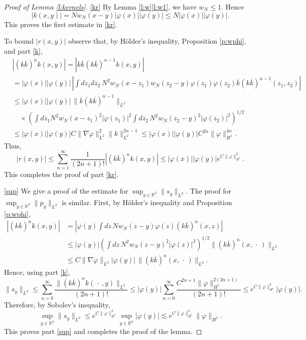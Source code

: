 \documentclass[11pt,a4paper,DIV11]{scrartcl}	%
\newcommand{\R}{\mathds{R}}
\begin{document}
\begin{proof}[Proof of Lemma \ref{l:kernels}]
  \ref{kr} By Lemma \ref{l:w}\ref{l:w1}, we have $w_N \leq 1$. Hence
  \[
    |k(x,y)| = N w_N(x-y) |\varphi(x)| |\varphi(y)| \leq N |\varphi(x)|
    |\varphi(y)|.
  \]
  This proves the first estimate in \ref{kr}.
   
  To bound $\lvert r(x,y)\rvert$ observe that, by H\"older's inequality,
  Proposition \ref{p:wphi}, and part \ref{k},
  \begin{align*}
    & |( k \overline{k})^n k(x,y)| = | k \overline{k} ( k \overline{k})^{n-1}
    k(x,y)| \\
    & = |\varphi(x)| |\varphi(y)| \, \left| \int dz_1 dz_2 \, N^2 w_N(x-z_1)
    w_N(z_2-y) \varphi(z_1) \varphi(z_2) \overline{k}(k
    \overline{k})^{n-1}(z_1,z_2) \right| \\
    & \le |\varphi(x)| |\varphi(y)| \, \| \overline{k} (k \overline{k})^{n-1}
    \|_{L^2} \\
    & \quad \times \left( \int dz_1 N^2 w_N(x-z_1)^2 |\varphi(z_1)|^2 \int
    dz_2 \, N^2 w_N(z_2-y)^2 |\varphi(z_2)|^2 \right)^{1/2} \\
    & \le |\varphi(x)| |\varphi(y)| C \| \nabla \varphi \|_{L^2}^2 \| k
    \|_{L^2}^{2n-1} \le |\varphi(x)| |\varphi(y)| C^{2n} \| \varphi
    \|_{H^1}^{4n}.
  \end{align*}
  Thus,
  \[
    |r(x,y)| \le \sum_{n=1}^\infty \frac{1}{(2n+1)!} |( k \overline{k})^n k
    (x,y)|\le |\varphi(x)| |\varphi(y)| e^{C \| \varphi \|_{H^1}^2}.
  \]
  This completes the proof of part \ref{kr}.


  \ref{sup} We give a proof of the estimate for $\sup_{y \in \R^3} \| s_y
  \|_{L^2}$. The proof for $\sup_{y \in \R^3} \| p_y \|_{L^2}$ is similar.
  First, by H\"older's inequality and Proposition \ref{p:wphi},
  \begin{align*}
    |(k \overline{k})^n k(x,y)| & = \left| \varphi(y) \int dz \, N w_N(z-y)
    \varphi(z) (k \overline{k})^n(x,z) \right| \\
    & \le |\varphi(y)| \left( \int dz \, N^2 w_N(z-y)^2 |\varphi(z)|^2
    \right)^{1/2} \| (k \overline{k})^n(x,\, \cdot\,) \|_{L^2} \\
    & \le C \| \nabla \varphi \|_{L^2} | \varphi(y)| \, \| (k \overline{k}
    )^n(x,\, \cdot\,) \|_{L^2}.
  \end{align*}
  Hence, using part \ref{k},
  \[
    \| s_y \|_{L^2} \le \sum_{n=0}^\infty \frac{\| (k \overline{k})^n k(\,
    \cdot\,,y) \|_{L^2}}{(2n+1)!} \le |\varphi(y)| \sum_{n=0}^\infty
    \frac{C^{2n+1} \| \varphi \|_{H^1}^{2(2n+1)}}{(2n+1)!} \le e^{C \|
    \varphi\|_{H^1}^2} |\varphi(y)|.
  \]
  Therefore, by Sobolev's inequality,
  \[
    \sup_{y \in \R^3} \| s_y \|_{L^2} \le e^{C \| \varphi \|_{H^1}^2} \sup_{y
    \in \R^3} |\varphi(y)| \apprle e^{C \| \varphi \|_{H^1}^2} \| \varphi
    \|_{H^2}.
  \]
  This proves part \ref{sup} and completes the proof of the lemma.
\end{proof}
\end{document}
